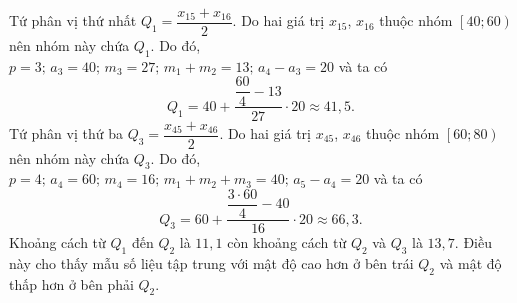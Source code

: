 \begin{bt}
{\begin{enumerate}
			Tứ phân vị thứ nhất $Q_1=\dfrac{x_{15}+x_{16}}{2}$. Do hai giá trị $x_{15}$, $x_{16}$ thuộc nhóm $\left[40;60\right)$ nên nhóm này chứa $Q_1$. Do đó, $p=3;\,a_3=40;\,m_3=27;\,m_1+m_2=13;\,a_4-a_3=20$ và ta có
			$$Q_1=40+\dfrac{\dfrac{60}{4}-13}{27}\cdot 20\approx 41{,}5.$$
			Tứ phân vị thứ ba $Q_3=\dfrac{x_{45}+x_{46}}{2}$. Do hai giá trị $x_{45}$, $x_{46}$ thuộc nhóm $\left[60;80\right)$ nên nhóm này chứa $Q_3$. Do đó, $p=4;\,a_4=60;\,m_4=16;\,m_1+m_2+m_3=40;\,a_5-a_4=20$ và ta có
			$$Q_3=60+\dfrac{\dfrac{3\cdot 60}{4}-40}{16}\cdot 20\approx 66{,}3.$$
			Khoảng cách từ $Q_1$ đến $Q_2$ là $11{,}1$ còn khoảng cách từ $Q_2$ và $Q_3$ là $13{,}7$. Điều này cho thấy mẫu số liệu tập trung với mật độ cao hơn ở bên trái $Q_2$ và mật độ thấp hơn ở bên phải $Q_2$.
		\end{enumerate}	
	}
\end{bt}

